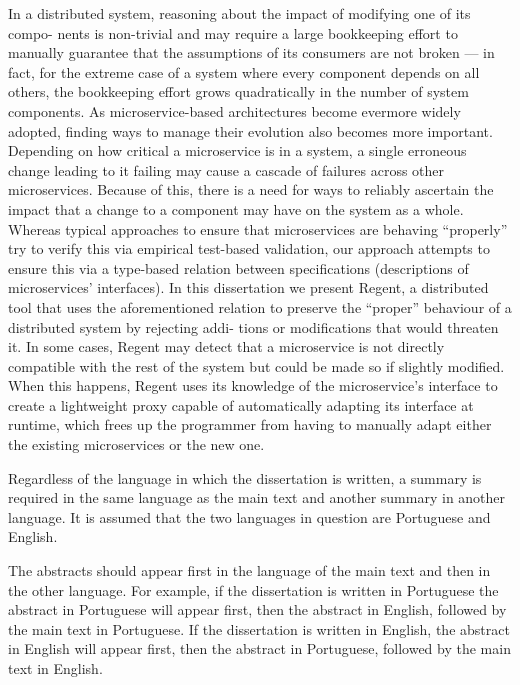 
%

In a distributed system, reasoning about the impact of modifying one of its compo-
nents is non-trivial and may require a large bookkeeping effort to manually guarantee
that the assumptions of its consumers are not broken — in fact, for the extreme case of
a system where every component depends on all others, the bookkeeping effort grows
quadratically in the number of system components.
As microservice-based architectures become evermore widely adopted, finding ways
to manage their evolution also becomes more important. Depending on how critical a
microservice is in a system, a single erroneous change leading to it failing may cause
a cascade of failures across other microservices. Because of this, there is a need for
ways to reliably ascertain the impact that a change to a component may have on the
system as a whole. Whereas typical approaches to ensure that microservices are behaving
“properly” try to verify this via empirical test-based validation, our approach attempts to
ensure this via a type-based relation between specifications (descriptions of microservices’
interfaces).
In this dissertation we present Regent, a distributed tool that uses the aforementioned
relation to preserve the “proper” behaviour of a distributed system by rejecting addi-
tions or modifications that would threaten it. In some cases, Regent may detect that a
microservice is not directly compatible with the rest of the system but could be made so
if slightly modified. When this happens, Regent uses its knowledge of the microservice’s
interface to create a lightweight proxy capable of automatically adapting its interface
at runtime, which frees up the programmer from having to manually adapt either the
existing microservices or the new one.


Regardless of the language in which the dissertation is written, a summary is required in the same language as the main text and another summary in another language. It is assumed that the two languages in question are Portuguese and English.

The abstracts should appear first in the language of the main text and then in the other language. For example, if the dissertation is written in Portuguese the abstract in Portuguese will appear first, then the abstract in English, followed by the main text in Portuguese. If the dissertation is written in English, the abstract in English will appear first, then the abstract in Portuguese, followed by the main text in English. 


